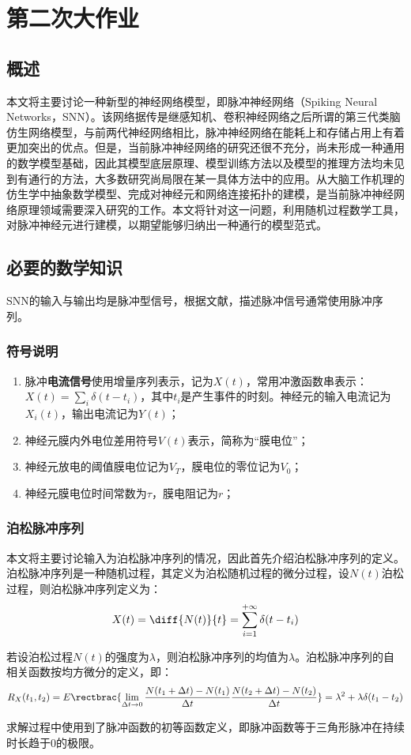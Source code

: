 \documentclass[11pt]{article}
\begin{document}
\section{第二次大作业}
\subsection{概述}
本文将主要讨论一种新型的神经网络模型，即脉冲神经网络（Spiking Neural Networks，SNN）。该网络据传是继感知机、卷积神经网络之后所谓的第三代类脑仿生网络模型，与前两代神经网络相比，脉冲神经网络在能耗上和存储占用上有着更加突出的优点。但是，当前脉冲神经网络的研究还很不充分，尚未形成一种通用的数学模型基础，因此其模型底层原理、模型训练方法以及模型的推理方法均未见到有通行的方法，大多数研究尚局限在某一具体方法中的应用。从大脑工作机理的仿生学中抽象数学模型、完成对神经元和网络连接拓扑的建模，是当前脉冲神经网络原理领域需要深入研究的工作。本文将针对这一问题，利用随机过程数学工具，对脉冲神经元进行建模，以期望能够归纳出一种通行的模型范式。
\subsection{必要的数学知识}
SNN的输入与输出均是脉冲型信号，根据文献\cite{jaegerEncyclopediaComputationalNeuroscience2015}，描述脉冲信号通常使用脉冲序列。
\subsubsection{符号说明}
\begin{enumerate}
  \item 脉冲\textbf{电流信号}使用增量序列表示，记为$X(t)$，常用冲激函数串表示：$X(t)=\sum\limits_i\delta(t-t_i)$，其中$t_i$是产生事件的时刻。神经元的输入电流记为$X_i(t)$，输出电流记为$Y(t)$；
  \item 神经元膜内外电位差用符号$V(t)$表示，简称为“膜电位”；
  \item 神经元放电的阈值膜电位记为$V_T$，膜电位的零位记为$V_0$；
  \item 神经元膜电位时间常数为$\tau$，膜电阻记为$r$；
\end{enumerate}
\subsubsection{泊松脉冲序列}
本文将主要讨论输入为泊松脉冲序列的情况，因此首先介绍泊松脉冲序列的定义。泊松脉冲序列是一种随机过程，其定义为泊松随机过程的微分过程\cite{ZhouYinQingSuiJiGuoChengLiLun2013}，设$N(t)$泊松过程，则泊松脉冲序列定义为：
\begin{align}
  X(t)=\diff{N(t)}{t}=\sum\limits_{i=1}^{+\infty}\delta(t-t_i)
  \label{eq:泊松脉冲序列定义}
\end{align}\par
若设泊松过程$N(t)$的强度为$\lambda$，则泊松脉冲序列的均值为$\lambda$。泊松脉冲序列的自相关函数按均方微分的定义，即：
\begin{align}
  R_X(t_1,t_2)=E\rectbrac{\lim_{\Delta t\to 0}\frac{N(t_1+\Delta t)-N(t_1)}{\Delta t}\frac{N(t_2+\Delta t)-N(t_2)}{\Delta t}}=\lambda^2+\lambda\delta(t_1-t_2)
  \label{eq:泊松脉冲序列自相关函数}
\end{align}\par
求解过程中使用到了脉冲函数的初等函数定义，即脉冲函数等于三角形脉冲在持续时长趋于0的极限。
\end{document}
